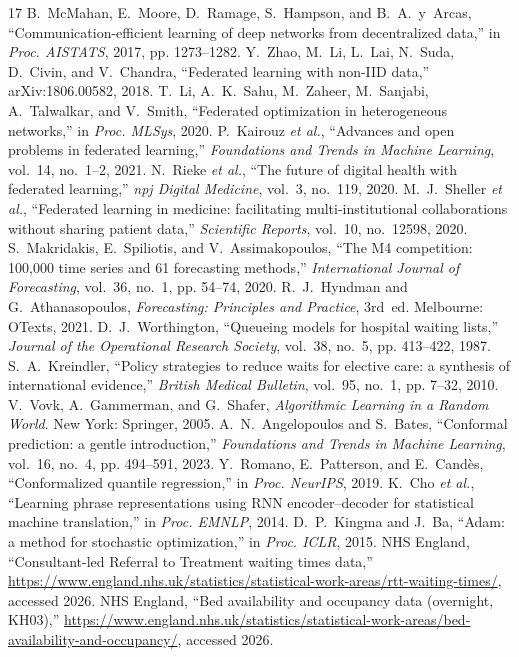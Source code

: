 \documentclass[conference]{IEEEtran}
\begin{document}
\begin{thebibliography}{17}
 B.~McMahan, E.~Moore, D.~Ramage, S.~Hampson, and B.~A.~y~Arcas,
``Communication-efficient learning of deep networks from decentralized data,'' in \emph{Proc.
AISTATS}, 2017, pp. 1273--1282.
 Y.~Zhao, M.~Li, L.~Lai, N.~Suda, D.~Civin, and V.~Chandra, ``Federated learning
with non-IID data,'' arXiv:1806.00582, 2018.
 T.~Li, A.~K.~Sahu, M.~Zaheer, M.~Sanjabi, A.~Talwalkar, and V.~Smith, ``Federated
optimization in heterogeneous networks,'' in \emph{Proc. MLSys}, 2020.
 P.~Kairouz \emph{et al.}, ``Advances and open problems in federated
learning,'' \emph{Foundations and Trends in Machine Learning}, vol.~14, no.~1--2, 2021.
 N.~Rieke \emph{et al.}, ``The future of digital health with federated
learning,'' \emph{npj Digital Medicine}, vol.~3, no.~119, 2020.
 M.~J.~Sheller \emph{et al.}, ``Federated learning in medicine: facilitating
multi-institutional collaborations without sharing patient data,'' \emph{Scientific Reports},
vol.~10, no.~12598, 2020.
 S.~Makridakis, E.~Spiliotis, and V.~Assimakopoulos, ``The M4 competition:
100,000 time series and 61 forecasting methods,'' \emph{International Journal of Forecasting},
vol.~36, no.~1, pp. 54--74, 2020.
 R.~J.~Hyndman and G.~Athanasopoulos, \emph{Forecasting: Principles and
Practice}, 3rd~ed. Melbourne: OTexts, 2021.
 D.~J.~Worthington, ``Queueing models for hospital waiting lists,''
\emph{Journal of the Operational Research Society}, vol.~38, no.~5, pp. 413--422, 1987.
 S.~A.~Kreindler, ``Policy strategies to reduce waits for elective care: a
synthesis of international evidence,'' \emph{British Medical Bulletin}, vol.~95, no.~1, pp. 7--32,
2010.
 V.~Vovk, A.~Gammerman, and G.~Shafer, \emph{Algorithmic Learning in a Random
World}. New York: Springer, 2005.
 A.~N.~Angelopoulos and S.~Bates, ``Conformal prediction: a gentle
introduction,'' \emph{Foundations and Trends in Machine Learning}, vol.~16, no.~4, pp. 494--591,
2023.
 Y.~Romano, E.~Patterson, and E.~Cand\`es, ``Conformalized quantile
regression,'' in \emph{Proc. NeurIPS}, 2019.
 K.~Cho \emph{et al.}, ``Learning phrase representations using RNN
encoder--decoder for statistical machine translation,'' in \emph{Proc. EMNLP}, 2014.
 D.~P.~Kingma and J.~Ba, ``Adam: a method for stochastic optimization,'' in
\emph{Proc. ICLR}, 2015.
 NHS England, ``Consultant-led Referral to Treatment waiting times data,''
\url{https://www.england.nhs.uk/statistics/statistical-work-areas/rtt-waiting-times/}, accessed
2026.
 NHS England, ``Bed availability and occupancy data (overnight, KH03),''
\url{https://www.england.nhs.uk/statistics/statistical-work-areas/bed-availability-and-occupancy/},
accessed 2026.
\end{thebibliography}
\end{document}
